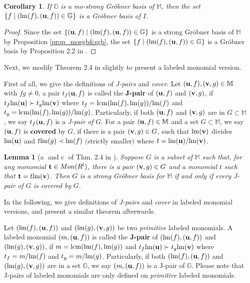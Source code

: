 \documentclass[final, number, 3p,12pt]{elsarticle}
\newtheorem{cor}[theorem]{Corollary}
\newtheorem{lemma}[theorem]{Lemma}
\def\G{{\mathbb{G}}}
\def\M{{\mathbb M}}
\def\lm{{\rm lm}} %
\def\t{{\bf t}}
\def\u{{\bf u}}
\def\v{{\bf v}}
\def\lcm{{\rm lcm}}
\begin{document}
\begin{cor}
If $\G$ is a mo-strong Gr\"obner basis of $\M$, then the set $\{f \mid (\lm(f), (\u, f)) \in \G\}$ is a Gr\"obner basis of $I$.
\end{cor}


\begin{proof}
Since the set $\{(\u, f) \mid (\lm(f), (\u, f))\in \G\}$ is a strong Gr\"obner basis of $\M$ by Proposition \ref{prop_mosgb&sgb}, the set $\{f \mid (\lm(f), (\u, f)) \in \G\}$ is a Gr\"obner basis by Proposition 2.2 in \citep{Gao10b}.
\end{proof}


Next, we modify Theorem 2.4 in \citep{Gao10b} slightly to present a labeled monomial version. 

First of all, we give the definitions of {\em J-pairs} and {\em cover}. Let  $(\u, f), (\v, g) \in \M$ with $fg\not=0$, a pair  $t_f(\u, f)$ is called the {\bf J-pair} of $(\u, f)$ and $(\v, g)$, if $t_f\lm(\u) \succ t_g\lm(\v)$ where $t_f = \lcm(\lm(f), \lm(g))/\lm(f)$ and $t_g = \lcm(\lm(f), \lm(g))/\lm(g)$. Particularly, if both $(\u, f)$ and $(\v, g)$ are in $G \subset \M$, we say $t_f(\u, f)$ is a {\em J-pair of $G$}. For a pair $(\u, f) \in \M$ and a set $G \subset \M$, we say $(\u, f)$ is {\bf covered} by $G$, if there is a pair $(\v, g)\in G$, such that $\lm(\v)$ divides $\lm(\u)$ and $t\lm(g) \prec \lm(f)$ $($strictly smaller$)$ where $t = \lm(\u)/\lm(\v)$.

\begin{lemma}[\textcircled{a} and \textcircled{c} of Thm. 2.4 in \citep{Gao10b}] \label{lem_gvw}
Suppose $G$ is a subset of $\M$ such that, for any monomial $\t \in Mon(R^l)$, there is a pair $(\v, g)\in G$ and a monomial $t$ such that $\t = t\lm(\v)$. Then $G$ is a strong Gr\"obner basis for $\M$ if and only if every J-pair of $G$ is covered by $G$.
\end{lemma}


In the following, we give definitions of {\em J-pairs} and {\em cover} in labeled monomial versions, and present a similar theorem afterwards.


Let $(\lm(f), (\u, f))$ and $(\lm(g), (\v, g))$ be two {\em primitive} labeled monomials. A labeled monomial $(m, (\u, f))$ is called the {\bf J-pair} of $(\lm(f), (\u, f))$ and $(\lm(g), (\v, g))$, if $m = \lcm(\lm(f), \lm(g))$ and $t_f\lm(\u) \succ t_g\lm(\v)$ where $t_f = m/\lm(f)$ and $t_g = m/\lm(g)$. Particularly, if both $(\lm(f), (\u, f))$ and $(\lm(g), (\v, g))$ are in a set $\G$, we say $(m, (\u, f))$ is a J-pair of $\G$. Please note that J-pairs of labeled monomials are only defined on {\em primitive} labeled monomials.
\end{document}

